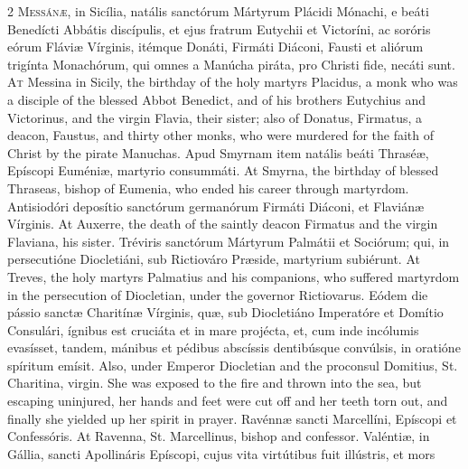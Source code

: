 \begin{paracol}{2}
\lettrine[lines=2]{M}{essánæ,} in Sicília, 
 natális sanctórum Mártyrum Plácidi Mónachi, e beáti Benedícti Abbátis 
 discípulis, et ejus fratrum Eutychii et Victoríni, ac soróris eórum Fláviæ 
 Vírginis, itémque Donáti, Firmáti Diáconi, Fausti et aliórum trigínta 
 Monachórum, qui omnes a Manúcha piráta, pro Christi fide, necáti sunt.
\switchcolumn
{}
\lettrine[lines=2]{A}{t} Messina in Sicily, the birthday 
 of the holy martyrs Placidus, a monk who was a disciple of the blessed Abbot 
 Benedict, and of his brothers Eutychius and Victorinus, and the virgin 
 Flavia, their sister; also of Donatus, Firmatus, a deacon, Faustus, and 
 thirty other monks, who were murdered for the faith of Christ by the pirate 
 Manuchas.
\switchcolumn*
{}
Apud Smyrnam item 
 natális beáti Thraséæ, Epíscopi Euméniæ, martyrio consummáti.
\switchcolumn
{}
At Smyrna, the birthday of blessed 
 Thraseas, bishop of Eumenia, who ended his career through martyrdom.
\switchcolumn*
{}
Antisiodóri deposítio 
 sanctórum germanórum Firmáti Diáconi, et Flaviánæ Vírginis.
\switchcolumn
{}
At Auxerre, the death of the saintly 
 deacon Firmatus and the virgin Flaviana, his sister.
\switchcolumn*
{}
Tréviris sanctórum 
 Mártyrum Palmátii et Sociórum; qui, in persecutióne Diocletiáni, sub 
 Rictiováro Præside, martyrium subiérunt.
\switchcolumn
{}
At Treves, the holy martyrs 
 Palmatius and his companions, who suffered martyrdom in the persecution of 
 Diocletian, under the governor Rictiovarus.
\switchcolumn*
{}
Eódem die pássio sanctæ 
 Charitínæ Vírginis, quæ, sub Diocletiáno Imperatóre et Domítio Consulári, 
 ígnibus est cruciáta et in mare projécta, et, cum inde incólumis evasísset, 
 tandem, mánibus et pédibus abscíssis dentibúsque convúlsis, in oratióne 
 spíritum emísit.
\switchcolumn
{}
Also, under Emperor Diocletian and 
 the proconsul Domitius, St. Charitina, virgin. She was exposed to the 
 fire and thrown into the sea, but escaping uninjured, her hands and feet 
 were cut off and her teeth torn out, and finally she yielded up her spirit 
 in prayer.
\switchcolumn*
{}
Ravénnæ sancti 
 Marcellíni, Epíscopi et Confessóris.
\switchcolumn
{}
At Ravenna, St. Marcellinus, bishop 
 and confessor.
\switchcolumn*
{}
Valéntiæ, in Gállia, 
 sancti Apollináris Epíscopi, cujus vita virtútibus fuit illústris, et mors 

\end{paracol}
